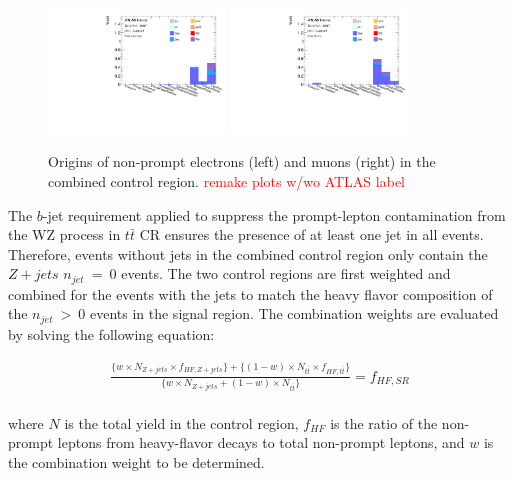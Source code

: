 \begin{figure}[htb]
        \centering
        \includegraphics[width = 0.42\textwidth]{figures/Analysis/Background/NonPromptComposition_Combined_Electrons.pdf}
        \includegraphics[width = 0.42\textwidth]{figures/Analysis/Background/NonPromptComposition_Combined_Muons.pdf}
        \caption{ Origins of non-prompt electrons (left) and muons (right) in the combined control region. \textcolor{red}{remake plots w/wo ATLAS label} \label{fig:NonPromptCombined}}
\end{figure}

The $b$-jet requirement applied to suppress the prompt-lepton contamination from the WZ process in $t\bar{t}$ CR ensures the presence of at least one jet in all events. Therefore, events without jets in the combined control region only contain the $Z+jets$ $n_{jet}~=~0$ events. The two control regions are first weighted and combined for the events with the jets to match the heavy flavor composition of the $n_{jet}~>~0$ events in the signal region. The combination weights are evaluated by solving the following equation$:$

\begin{equation}
\begin{aligned}
\frac{\{w \times N_{Z+jets} \times f_{HF, Z+jets}\} + \{ (1-w) \times N_{t\bar{t}} \times f_{HF, t\bar{t}}\}}{\{w \times N_{Z+jets} + (1-w) \times N_{t\bar{t}} \}} = f_{HF, SR}  \\
\end{aligned}
\end{equation}

where $N$ is the total yield in the control region, $ f_{HF}$ is the ratio of the non-prompt leptons from heavy-flavor decays to total non-prompt leptons, and $w$ is the combination weight to be determined.

